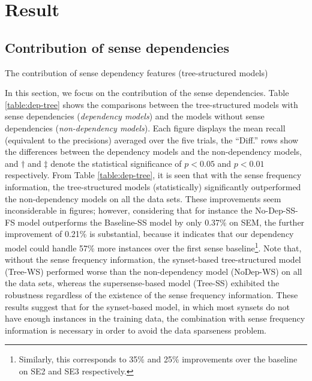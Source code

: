 \documentclass[english]{jnlp_1.4}
\begin{document}
\section{Result}
\label{section:result}


\subsection{Contribution of sense dependencies}


\begin{table}[b]
\caption{The contribution of sense dependency features (tree-structured models)}
\label{table:dep-tree}

\end{table}


In this section, we focus on the contribution of the sense dependencies.
Table \ref{table:dep-tree} shows the comparisons between the tree-structured models with sense dependencies (\textit{dependency models}) and the models without sense dependencies (\textit{non-dependency models}).
Each figure displays the mean recall (equivalent to the precisions) averaged over the five trials, the ``Diff.'' rows show the differences between the dependency models and the non-dependency models, and $\dagger$ and $\ddagger$ denote the statistical significance of $p<0.05$ and $p<0.01$ respectively.
From Table \ref{table:dep-tree}, it is seen that with the sense frequency information, the tree-structured models (statistically) significantly outperformed the non-dependency models on all the data sets.
These improvements seem inconsiderable in figures; however, considering that for instance the No-Dep-SS-FS model outperforms the Baseline-SS model by only 0.37\% on SEM, the further improvement of 0.21\% is substantial, because it indicates that our dependency model could handle 57\% more instances over the first sense baseline\footnote{Similarly, this corresponds to 35\% and 25\% improvements over the baseline on SE2 and SE3 respectively.}.
Note that, without the sense frequency information, the synset-based tree-structured model (Tree-WS) performed worse than the non-dependency model (NoDep-WS) on all the data sets, whereas the supersense-based model (Tree-SS) exhibited the robustness regardless of the existence of the sense frequency information.
These results suggest that for the synset-based model, in which most synsets do not have enough instances in the training data, the combination with sense frequency information is necessary in order to avoid the data sparseness problem.
\end{document}
